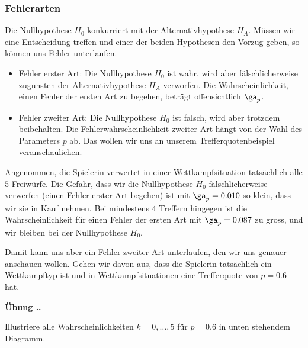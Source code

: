 \documentclass[%
11pt,%
twoside,%
titlepage,%
german,%
headsepline%
]{scrartcl}
\newcommand{\faEyeLightGray}{\textcolor{lightgray}{\faEye}} %
\newcommand{\concatueb}[1]{ueb:#1}%
\newcommand{\concatlsg}[1]{lsg:#1}%
\newcounter{uebcounter}[section]
\renewcommand{\theuebcounter}{\thesection.\arabic{uebcounter}}  %
\newenvironment{uebenv}[1]{%
    \refstepcounter{uebcounter}
    \par\noindent\textbf{Übung \theuebcounter.}%
    \label{\concatueb{#1}}\hfill\hyperref[\concatlsg{#1}]{\faEyeLightGray}\newline
}{%
    \par
}
\newcommand{\definition}[1]{\colorbox{emerald}{#1}}
\begin{document}
\subsubsection{Fehlerarten}

Die Nullhypothese $H_0$ konkurriert mit der Alternativhypothese $H_A$. Müssen wir eine Entscheidung treffen und einer der beiden Hypothesen den Vorzug geben, so können uns Fehler unterlaufen.

\begin{itemize}
\item \definition{Fehler erster Art}: Die Nullhypothese $H_0$ ist wahr, wird aber fälschlicherweise zugunsten der Alternativhypothese $H_A$ verworfen. Die Wahrscheinlichkeit, einen Fehler der ersten Art zu begehen, beträgt offensichtlich $\ga_p$.
\item \definition{Fehler zweiter Art}:
Die Nullhypothese $H_0$ ist falsch, wird aber trotzdem beibehalten. Die Fehlerwahrscheinlichkeit zweiter Art hängt von der Wahl des Parameters $p$ ab. Das wollen wir uns an unserem Trefferquotenbeispiel veranschaulichen.
\end{itemize}

Angenommen, die Spielerin verwertet in einer Wettkampfsituation tatsächlich alle $5$ Freiwürfe. Die Gefahr, dass wir die Nullhypothese $H_0$ fälschlicherweise verwerfen (einen Fehler erster Art begehen) ist mit $\ga_p=0.010$ so klein, dass wir sie in Kauf nehmen. Bei mindestens $4$ Treffern hingegen ist die Wahrscheinlichkeit für einen Fehler der ersten Art mit $\ga_p=0.087$ zu gross, und wir bleiben bei der Nullhypothese $H_0$.

Damit kann uns aber ein Fehler zweiter Art unterlaufen, den wir uns genauer anschauen wollen. Gehen wir davon aus, dass die Spielerin tatsächlich ein Wettkampftyp ist und in Wettkampfsituationen eine Trefferquote von $p=0.6$ hat.

\begin{uebenv}{illustrierefehlerzweiterart}
Illustriere alle Wahrscheinlichkeiten $k=0,\dots,5$ für $p=0.6$ in unten stehendem Diagramm.

\begin{center}
\end{center}
\end{uebenv}
\end{document}
